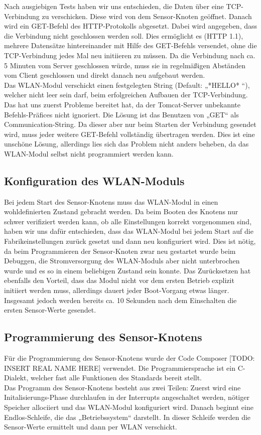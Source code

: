 \documentclass[12pt,a4paper,twoside]{article}
\begin{document}
Nach ausgiebigen Tests haben wir uns entschieden, die Daten über eine TCP-Verbindung zu verschicken. Diese wird von dem Sensor-Knoten geöffnet. Danach wird ein GET-Befehl des HTTP-Protokolls abgesetzt. Dabei wird angegeben, dass die Verbindung nicht geschlossen werden soll. Dies ermöglicht es (HTTP 1.1), mehrere Datensätze hintereinander mit Hilfe des GET-Befehls versendet, ohne die TCP-Verbindung jedes Mal neu initiieren zu müssen. Da die Verbindung nach ca. 5 Minuten vom Server geschlossen würde, muss sie in regelmäßigen Abständen vom Client geschlossen und direkt danach neu aufgebaut werden.  \\
Das WLAN-Modul verschickt einen festgelegten String (Default: „*HELLO* “), welcher nicht leer sein darf, beim erfolgreichen Aufbauen der TCP-Verbindung. Das hat uns zuerst Probleme bereitet hat, da der Tomcat-Server unbekannte Befehls-Präfices nicht ignoriert. Die Lösung ist das Benutzen von „GET“ als Communication-String. Da dieser aber nur beim Starten der Verbindung gesendet wird, muss jeder weitere GET-Befehl vollständig übertragen werden. Dies ist eine unschöne Lösung, allerdings lies sich das Problem nicht anders beheben, da das WLAN-Modul selbst nicht programmiert werden kann.

\subsection{Konfiguration des WLAN-Moduls}
Bei jedem Start des Sensor-Knotens muss das WLAN-Modul in einen wohldefinierten Zustand gebracht werden. Da beim Booten des Knotens nur schwer verifiziert werden kann, 
ob alle Einstellungen korrekt vorgenommen sind, haben wir uns dafür entschieden, dass das WLAN-Modul bei jedem Start auf die Fabrikeinstellungen  zurück gesetzt und dann neu konfiguriert wird. 
Dies ist nötig, da beim Programmieren der Sensor-Knoten zwar neu gestartet wurde beim Debuggen, die Stromversorgung des WLAN-Moduls aber nicht unterbrochen wurde und es so in einem beliebigen Zustand sein konnte. 
Das Zurücksetzen hat ebenfalls den Vorteil, dass das Modul nicht vor dem ersten Betrieb explizit initiiert werden muss, allerdings dauert jeder Boot-Vorgang etwas länger. Insgesamt jedoch werden bereits ca. 10 Sekunden nach dem Einschalten die ersten Sensor-Werte gesendet. 


\subsection{Programmierung des Sensor-Knotens}
Für die Programmierung des Sensor-Knotens wurde der Code Composer  [TODO: INSERT REAL NAME HERE] verwendet. Die Programmiersprache ist ein C-Dialekt, welcher fast alle Funktionen des Standards bereit stellt. \\
Das Programm des Sensor-Knotens besteht aus zwei Teilen: Zuerst wird eine Initalisierungs-Phase durchlaufen in der Interrupts angeschaltet werden, nötiger Speicher allociiert und das WLAN-Modul konfiguriert wird. Danach beginnt eine Endlos-Schleife, die das „Betriebssystem“ darstellt. 
In dieser Schleife werden die Sensor-Werte ermittelt und dann per WLAN verschickt.
\end{document}
